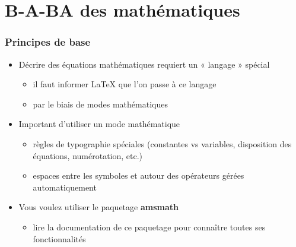 \section{B-A-BA des mathématiques}


\begin{frame}[fragile]

	\frametitle{Principes de base}
	
	\begin{itemize}
		\item Décrire des équations mathématiques requiert un « langage » spécial
		\begin{itemize}
			\item il faut informer {\LaTeX} que l’on passe à ce langage
			\item par le biais de modes mathématiques
		\end{itemize}
	
		\item Important d’utiliser un mode mathématique
		\begin{itemize}
			\item règles de typographie spéciales (constantes vs variables, disposition des équations, 	numérotation, etc.)
			\item espaces entre les symboles et autour des opérateurs gérées automatiquement
		\end{itemize}
	
		\item Vous voulez utiliser le paquetage \textbf{amsmath}
			\begin{codesource}
	\usepackage{amsmath}	
			\end{codesource}

			\begin{itemize}
				\item lire la documentation de ce paquetage pour connaître toutes ses fonctionnalités
			\end{itemize}
	\end{itemize}
\end{frame}


